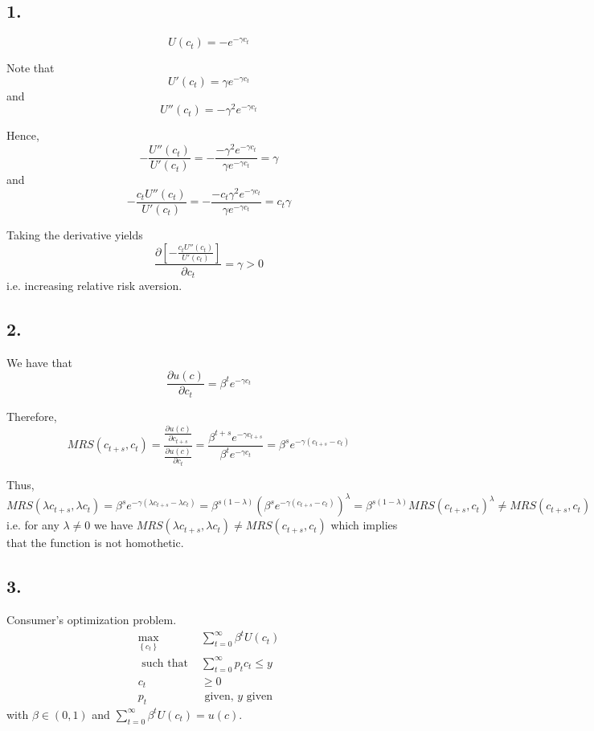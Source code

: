 \documentclass[12pt]{article}
\theoremstyle{definition}
\newcommand\st{\text{ such that }}
\newcommand{\cbra}[1]{\left\{#1\right\}}
\begin{document}
\subsection*{1.}

\[
U(c_t) = -e^{-\gamma c_t}
\]

Note that
\[
U'(c_t) = \gamma e^{-\gamma c_t}
\]
and
\[
U''(c_t) = -\gamma^2 e^{-\gamma c_t}
\]

Hence,
\[
-\frac{U''(c_t)}{U'(c_t)} = -\frac{-\gamma^2 e^{-\gamma c_t}}{\gamma e^{-\gamma c_t}} = \gamma
\]
and
\[
-\frac{c_t U''(c_t)}{U'(c_t)} =  -\frac{-c_t\gamma^2 e^{-\gamma c_t}}{\gamma e^{-\gamma c_t}} = c_t\gamma
\]

Taking the derivative yields
\[
\frac{\partial\left[ -\frac{c_t U''(c_t)}{U'(c_t)}\right] }{\partial c_t} = \gamma >0
\]
i.e. increasing relative risk aversion.

\subsection*{2.}

We have that
\[
\frac{\partial u(c)}{\partial c_{t}} = \beta^t e^{-\gamma c_t}
\]

Therefore,
\[
MRS(c_{t+s},c_t)=\frac{\frac{\partial u(c)}{\partial c_{t+s}}}{\frac{\partial u(c)}{\partial c_{t}}} = \frac{\beta^{t+s} e^{-\gamma c_{t+s}}}{\beta^t e^{-\gamma c_t}} =  \beta^s e^{-\gamma (c_{t+s}-c_t)}
\]

Thus,
\[
MRS(\lambda c_{t+s},\lambda c_t)= \beta^s e^{-\gamma (\lambda c_{t+s}- \lambda c_t)} = \beta^{s(1-\lambda)} (\beta^s  e^{-\gamma ( c_{t+s}-c_t)})^\lambda = \beta^{s(1-\lambda)} MRS(c_{t+s},c_t)^\lambda \neq MRS(c_{t+s},c_t) 
\]
i.e. for any $\lambda \neq 0$ we have $MRS(\lambda c_{t+s},\lambda c_t)\neq MRS(c_{t+s},c_t)$ which implies that the function is not homothetic.

\subsection*{3.}

Consumer's optimization problem.
\[
\begin{split}
\underset{\cbra{c_t}}{\max} &\sum_{t=0}^{\infty}\beta^t U(c_t)\\
\st & \sum_{t=0}^{\infty} p_t c_t \leq y\\
c_t &\geq 0\\
p_t &\text{ given, } y \text{ given}
\end{split}
\]
with $\beta \in (0,1)$ and $\sum_{t=0}^{\infty}\beta^t U(c_t)=u(c)$.
\end{document}
